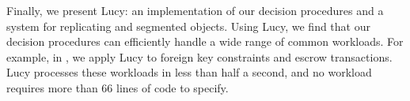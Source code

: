 Finally, we present Lucy: an implementation of our decision procedures and a
system for replicating \invariantconfluent{} and segmented
\invariantconfluent{} objects. Using Lucy, we find that our decision procedures
can efficiently handle a wide range of common workloads. For example, in
, we apply Lucy to foreign key constraints and escrow
transactions. Lucy processes these workloads in less than half a second, and no
workload requires more than 66 lines of code to specify.
